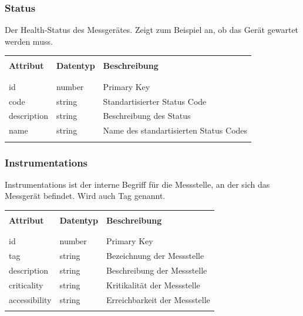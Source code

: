 \subsubsection{Status}
Der Health-Status des Messgerätes. Zeigt zum Beispiel an, ob das Gerät gewartet werden muss.
\begin{table}[H]
  \begin{tabularx}{\textwidth}{l l X}\hline \\
    \textbf{Attribut} & \textbf{Datentyp} & \textbf{Beschreibung}  \\ \\\hline \\
    id & number & Primary Key \\
    code & string & Standartisierter Status Code \\
    description & string & Beschreibung des Status \\
    name & string & Name des standartisierten Status Codes \\
    \\\hline
  \end{tabularx}
\end{table}
\subsubsection{Instrumentations}
Instrumentations ist der interne Begriff für die Messstelle, an der sich das Messgerät befindet. Wird auch Tag genannt.
\begin{table}[H]
  \begin{tabularx}{\textwidth}{l l X}\hline \\
    \textbf{Attribut} & \textbf{Datentyp} & \textbf{Beschreibung}  \\ \\\hline \\
    id & number & Primary Key \\
    tag & string & Bezeichnung der Messstelle \\
    description & string & Beschreibung der Messstelle \\
    criticality & string & Kritikalität der Messstelle \\
    accessibility & string & Erreichbarkeit der Messstelle \\
    \\\hline
  \end{tabularx}
\end{table}
